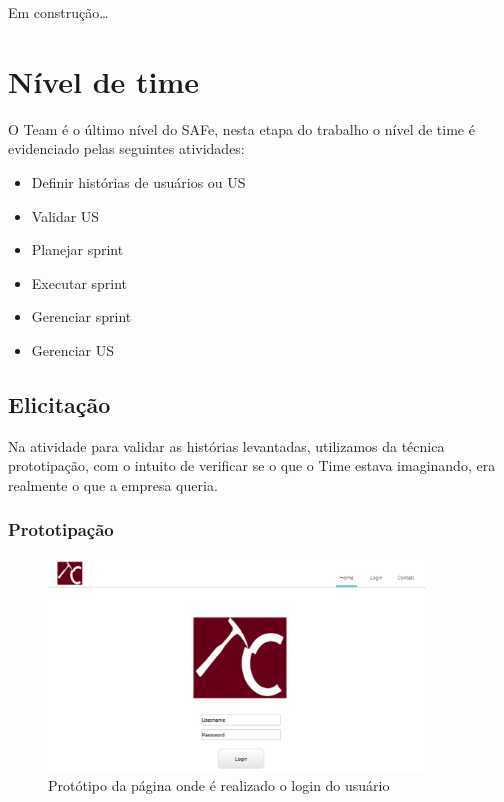   Em construção\ldots

\section{Nível de time}

  O Team é o último nível do SAFe, nesta etapa do trabalho o nível de time é evidenciado pelas seguintes atividades:

  \begin{itemize}
    \item Definir histórias de usuários ou US
    \item Validar US
    \item Planejar sprint
    \item Executar sprint
    \item Gerenciar sprint
    \item Gerenciar US
  \end{itemize}

\clearpage
\subsection{Elicitação}
  Na atividade para validar as histórias levantadas, utilizamos da técnica prototipação, com o intuito de verificar se o que o Time estava imaginando, era realmente o que a empresa queria.
\subsubsection{Prototipação}
  
  \label{pagina-inicial}

  \begin{figure}[!htb]
    \centering
    \includegraphics[width=10cm, keepaspectratio=false]{figuras/gerencia/pagina-inicial.eps}
    \caption{Protótipo da página onde é realizado o login do usuário}
  \end{figure}


  \label{pagina-upload}

